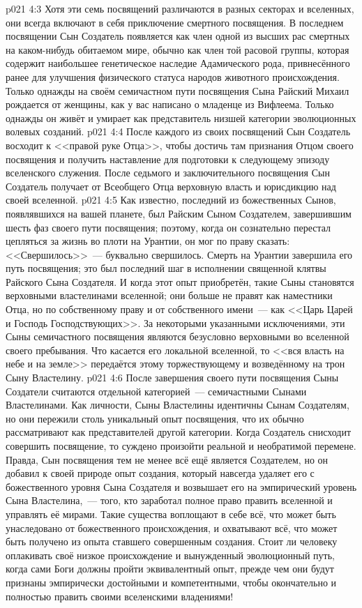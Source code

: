 \vs p021 4:3 Хотя эти семь посвящений различаются в разных секторах и вселенных, они всегда включают в себя приключение смертного посвящения. В последнем посвящении Сын Создатель появляется как член одной из высших рас смертных на каком\hyp{}нибудь обитаемом мире, обычно как член той расовой группы, которая содержит наибольшее генетическое наследие Адамического рода, привнесённого ранее для улучшения физического статуса народов животного происхождения. Только однажды на своём семичастном пути посвящения Сына Райский Михаил рождается от женщины, как у вас написано о младенце из Вифлеема. Только однажды он живёт и умирает как представитель низшей категории эволюционных волевых созданий.
\vs p021 4:4 После каждого из своих посвящений Сын Создатель восходит к <<правой руке Отца>>, чтобы достичь там признания Отцом своего посвящения и получить наставление для подготовки к следующему эпизоду вселенского служения. После седьмого и заключительного посвящения Сын Создатель получает от Всеобщего Отца верховную власть и юрисдикцию над своей вселенной.
\vs p021 4:5 \pc Как известно, последний из божественных Сынов, появлявшихся на вашей планете, был Райским Сыном Создателем, завершившим шесть фаз своего пути посвящения; поэтому, когда он сознательно перестал цепляться за жизнь во плоти на Урантии, он мог по праву сказать: <<Свершилось>>~--- буквально свершилось. Смерть на Урантии завершила его путь посвящения; это был последний шаг в исполнении священной клятвы Райского Сына Создателя. И когда этот опыт приобретён, такие Сыны становятся верховными властелинами вселенной; они больше не правят как наместники Отца, но по собственному праву и от собственного имени~--- как <<Царь Царей и Господь Господствующих>>. За некоторыми указанными исключениями, эти Сыны семичастного посвящения являются безусловно верховными во вселенной своего пребывания. Что касается его локальной вселенной, то <<вся власть на небе и на земле>> передаётся этому торжествующему и возведённому на трон Сыну Властелину.
\vs p021 4:6 \pc После завершения своего пути посвящения Сыны Создатели считаются отдельной категорией~--- семичастными Сынами Властелинами. Как личности, Сыны Властелины идентичны Сынам Создателям, но они пережили столь уникальный опыт посвящения, что их обычно рассматривают как представителей другой категории. Когда Создатель снисходит совершить посвящение, то суждено произойти реальной и необратимой перемене. Правда, Сын посвящения тем не менее всё ещё является Создателем, но он добавил к своей природе опыт создания, который навсегда удаляет его с божественного уровня Сына Создателя и возвышает его на эмпирический уровень Сына Властелина,~--- того, кто заработал полное право править вселенной и управлять её мирами. Такие существа воплощают в себе всё, что может быть унаследовано от божественного происхождения, и охватывают всё, что может быть получено из опыта ставшего совершенным создания. Стоит ли человеку оплакивать своё низкое происхождение и вынужденный эволюционный путь, когда сами Боги должны пройти эквивалентный опыт, прежде чем они будут признаны эмпирически достойными и компетентными, чтобы окончательно и полностью править своими вселенскими владениями!
